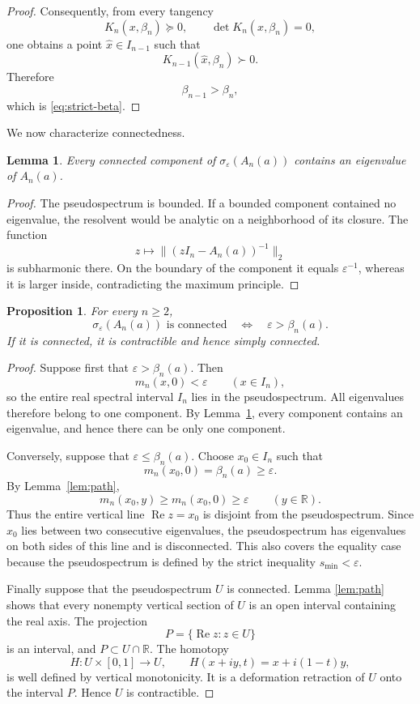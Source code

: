 \documentclass[11pt]{article}
\newtheorem{lemma}[theorem]{Lemma}
\newtheorem{proposition}[theorem]{Proposition}
\begin{document}
\begin{proof}
Consequently, from every tangency
\[
K_n(x,\beta_n)\succeq0,\qquad \det K_n(x,\beta_n)=0,
\]
one obtains a point \(\widehat x\in I_{n-1}\) such that
\[
K_{n-1}(\widehat x,\beta_n)\succ0.
\]
Therefore
\[
\beta_{n-1}>\beta_n,
\]
which is \eqref{eq:strict-beta}.
\end{proof}

We now characterize connectedness.

\begin{lemma}\label{lem:components}
Every connected component of
\(\sigma_\varepsilon(A_n(a))\) contains an eigenvalue of \(A_n(a)\).
\end{lemma}

\begin{proof}
The pseudospectrum is bounded.  If a bounded component contained no
eigenvalue, the resolvent would be analytic on a neighborhood of its closure.
The function
\[
z\longmapsto\|(zI_n-A_n(a))^{-1}\|_2
\]
is subharmonic there.  On the boundary of the component it equals
\(\varepsilon^{-1}\), whereas it is larger inside, contradicting the maximum
principle.
\end{proof}

\begin{proposition}\label{prop:criterion}
For every \(n\geq2\),
\[
\sigma_\varepsilon(A_n(a))
\text{ is connected}
\quad\Longleftrightarrow\quad
\varepsilon>\beta_n(a).
\tag{17}\label{eq:connected-criterion}
\]
If it is connected, it is contractible and hence simply connected.
\end{proposition}

\begin{proof}
Suppose first that \(\varepsilon>\beta_n(a)\).  Then
\[
m_n(x,0)<\varepsilon
\qquad(x\in I_n),
\]
so the entire real spectral interval \(I_n\) lies in the pseudospectrum.
All eigenvalues therefore belong to one component.  By
Lemma~\ref{lem:components}, every component contains an eigenvalue, and hence
there can be only one component.

Conversely, suppose that \(\varepsilon\leq\beta_n(a)\).  Choose
\(x_0\in I_n\) such that
\[
m_n(x_0,0)=\beta_n(a)\geq\varepsilon.
\]
By Lemma~\ref{lem:path},
\[
m_n(x_0,y)\geq m_n(x_0,0)\geq\varepsilon
\qquad(y\in\mathbb R).
\]
Thus the entire vertical line \(\operatorname{Re}z=x_0\) is disjoint from the
pseudospectrum.  Since \(x_0\) lies between two consecutive eigenvalues, the
pseudospectrum has eigenvalues on both sides of this line and is disconnected.
This also covers the equality case because the pseudospectrum is defined by
the strict inequality \(s_{\min}<\varepsilon\).

Finally suppose that the pseudospectrum \(U\) is connected.  Lemma
\ref{lem:path} shows that every nonempty vertical section of \(U\) is an open
interval containing the real axis.  The projection
\[
P=\{\operatorname{Re}z:z\in U\}
\]
is an interval, and \(P\subset U\cap\mathbb R\).  The homotopy
\[
H:U\times[0,1]\longrightarrow U,
\qquad
H(x+iy,t)=x+i(1-t)y,
\]
is well defined by vertical monotonicity.  It is a deformation retraction of
\(U\) onto the interval \(P\).  Hence \(U\) is contractible.
\end{proof}
\end{document}
